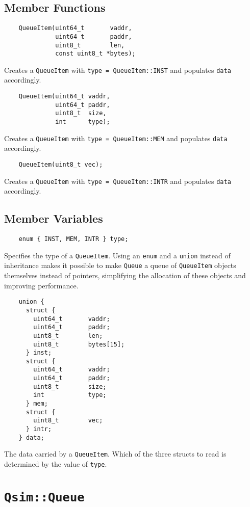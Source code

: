 \documentclass[letterpaper, 10pt]{book}
\begin{document}
\subsection{Member Functions}
\begin{verbatim}
    QueueItem(uint64_t       vaddr,
              uint64_t       paddr,
              uint8_t        len,
              const uint8_t *bytes);
\end{verbatim}
Creates a \texttt{QueueItem} with \texttt{type = QueueItem::INST} and populates
\texttt{data} accordingly.

\begin{verbatim}
    QueueItem(uint64_t vaddr, 
              uint64_t paddr, 
              uint8_t  size, 
              int      type);
\end{verbatim}
Creates a \texttt{QueueItem} with \texttt{type = QueueItem::MEM} and populates
\texttt{data} accordingly.

\begin{verbatim}
    QueueItem(uint8_t vec);
\end{verbatim}
Creates a \texttt{QueueItem} with \texttt{type = QueueItem::INTR} and populates
\texttt{data} accordingly.

\subsection{Member Variables}
\begin{verbatim}
    enum { INST, MEM, INTR } type;
\end{verbatim}
Specifies the type of a \texttt{QueueItem}. Using an \texttt{enum} and a 
\texttt{union} instead of inheritance makes it possible to make \texttt{Queue}
a queue of \texttt{QueueItem} objects themselves instead of pointers, 
simplifying the allocation of these objects and improving performance.

\begin{verbatim}
    union {
      struct {
        uint64_t       vaddr;
        uint64_t       paddr;
        uint8_t        len;
        uint8_t        bytes[15];
      } inst;
      struct {
        uint64_t       vaddr;
        uint64_t       paddr;
        uint8_t        size;
        int            type;
      } mem;
      struct {
        uint8_t        vec;
      } intr;
    } data;
\end{verbatim}
The data carried by a \texttt{QueueItem}. Which of the three structs to read
is determined by the value of \texttt{type}.
\newpage

\section{\texttt{Qsim::Queue}} \label{class:Queue}
\end{document}

